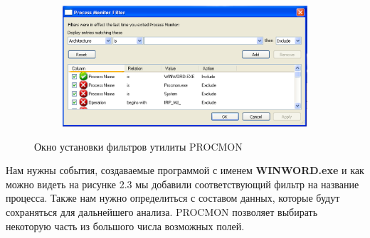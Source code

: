 \begin{figure}[ht]
	\centering
    \begin{subfigure}[b]{1\textwidth}
    \centering
        \includegraphics[scale=0.5]{procmon_filters.png}        
    \end{subfigure}
 
    \caption{Окно установки фильтров утилиты PROCMON}
    \label{fig_parsetree}
\end{figure}

\newpage
Нам нужны события, создаваемые программой с именем \textbf{WINWORD.exe} и как можно видеть на рисунке 2.3 мы добавили соответствующий фильтр на название процесса.
Также нам нужно определиться с составом данных, которые будут сохраняться для дальнейшего анализа.
PROCMON позволяет выбирать некоторую часть из большого числа возможных полей.

